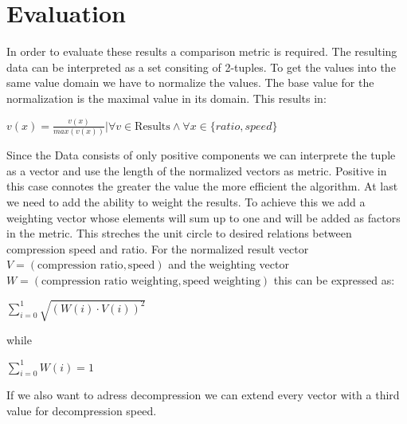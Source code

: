 \documentclass[
	12pt,
	a4paper,
	BCOR10mm,
	DIV14,
	listof=totoc,
	bibliography=totoc,
	headsepline
]{scrreprt}
\begin{document}
\begin{table}
\begin{center}
\caption{All Data Sets, Decompression Speed}
\label{tab:ov_dec}
\end{center}
\end{table}


\section{Evaluation}
In order to evaluate these results a comparison metric is required.
The resulting data can be interpreted as a set consiting of 2-tuples.
To get the values into the same value domain we have to normalize the values.
The base value for the normalization is the maximal value in its domain.
This results in:
\begin{center}
	\(
	   v(x) = \frac{v(x)}{max(v(x))}|\forall v \in \text{Results} \land \forall x \in \{ratio, speed\}
	\)
\end{center}

Since the Data consists of only positive components we can interprete the tuple as a vector and use the length of the normalized vectors as metric. 
Positive in this case connotes the greater the value the more efficient the algorithm.
At last we need to add the ability to weight the results. 
To achieve this we add a weighting vector whose elements will sum up to one and will be added as factors in the metric. 
This streches the unit circle to desired relations between compression speed and ratio.
For the normalized result vector \(V = (\text{compression ratio}, \text{speed})\) and the weighting vector \(W = (\text{compression ratio weighting}, \text{speed weighting})\) this can be expressed as:
\begin{center}
	\(
	\sum\limits^{1}_{i=0} \sqrt{(W(i) \cdot V(i))^2}
	\)
\end{center}
while
\begin{center}
	\(
	\sum\limits^{1}_{i=0}W(i) = 1
	\)
\end{center}
If we also want to adress decompression we can extend every vector with a third value for decompression speed.
\end{document}
